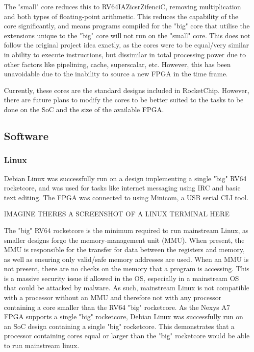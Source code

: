 The "small" core reduces this to RV64IAZicsrZifenciC\cite{riscv-1}, removing multiplication and both types of floating-point arithmetic. This reduces the capability of the core significantly, and means programs compiled for the "big" core that utilise the extensions unique to the "big" core will not run on the "small" core. This does not follow the original project idea exactly, as the cores were to be equal/very similar in ability to execute instructions, but dissimilar in total processing power due to other factors like pipelining, cache, superscalar, etc. However, this has been unavoidable due to the inability to source a new FPGA in the time frame.

Currently, these cores are the standard designs included in RocketChip\cite{rocketchip}. However, there are future plans to modify the cores to be better suited to the tasks to be done on the SoC and the size of the available FPGA.

\subsection{Software}
\subsubsection{Linux}
Debian Linux was successfully run on a design implementing a single "big" RV64 rocketcore, and was used for tasks like internet messaging using IRC\cite{irc} and basic text editing. The FPGA was connected to using Minicom\cite{minicom}, a USB serial CLI tool.

IMAGINE THERES A SCREENSHOT OF A LINUX TERMINAL HERE

The "big" RV64 rocketcore is the minimum required to run mainstream Linux, as smaller designs forgo the memory-management unit (MMU). When present, the MMU is responsible for the transfer for data between the registers and memory, as well as ensuring only valid/safe memory addresses are used. When an MMU is not present, there are no checks on the memory that a program is accessing. This is a massive security issue if allowed in the OS, especially in a mainstream OS that could be attacked by malware. As such, mainstream Linux is not compatible with a processor without an MMU\cite{linux-memory} and therefore not with any processor containing a core smaller than the RV64 "big" rocketcore. As the Nexys A7 FPGA supports a single "big" rocketcore, Debian Linux\cite{debianriscv} was successfully run on an SoC design containing a single "big" rocketcore. This demonstrates that a processor containing cores equal or larger than the "big" rocketcore would be able to run mainstream linux.

